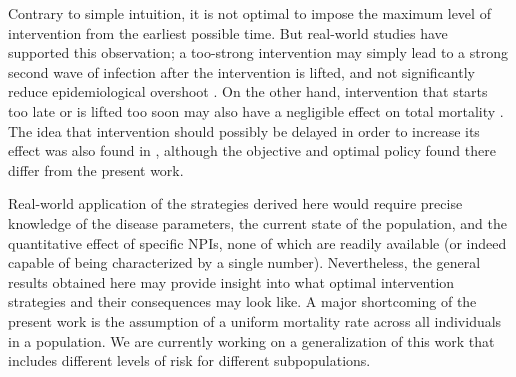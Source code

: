 \documentclass[english,12pt,letter]{article}
\newcommand{\Sinf}{x_\infty}
\begin{document}
Contrary to simple intuition, it is not optimal to impose the maximum
level of intervention from the earliest possible time.  But real-world
studies have supported this observation; a too-strong intervention
may simply lead to a strong second wave of infection after
the intervention is lifted, and not significantly reduce epidemiological
overshoot \cite{bootsma2007effect}.  On the other hand, intervention that
starts too late or is lifted too soon may also have a negligible
effect on total mortality \cite{bootsma2007effect,hatchett2007public,markel2007nonpharmaceutical}.
The idea that intervention should possibly be delayed in order to increase
its effect was also found in \cite{ballard2017intervention}, although 
the objective and optimal policy found there differ from the present work.


Real-world application of the strategies derived here would require
precise knowledge of the disease parameters, the current state of the
population, and the quantitative effect of specific NPIs, none of which
are readily available (or indeed capable of being characterized by a single
number).  Nevertheless, the general results obtained here may provide insight
into what optimal intervention strategies and their consequences may look like.
A major shortcoming of the present work is the assumption of a uniform mortality
rate across all individuals in a population.  We are currently working
on a generalization of this work that includes different levels of risk for
different subpopulations.



\end{document}
